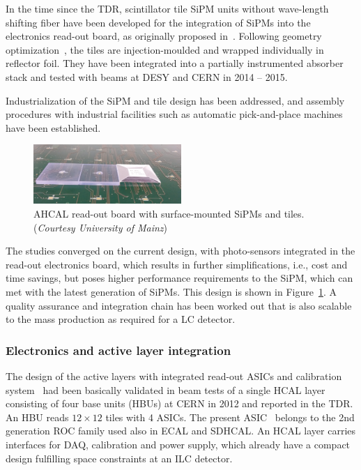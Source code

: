 In the time since the TDR, scintillator tile SiPM units without wave-length shifting fiber have been developed for the integration of SiPMs into the electronics read-out board, as originally proposed in~\cite{Blazey:2009zz}. Following geometry optimization~\cite{2010NIMPA.620..196S,Liu:2015cpe}, the tiles are injection-moulded and wrapped individually in reflector foil. They have been integrated into a partially instrumented absorber stack and tested with beams at DESY and CERN in 2014 -- 2015.

Industrialization of the SiPM and tile design has been addressed, and assembly procedures with industrial facilities such as automatic pick-and-place machines have been established. 

\begin{figure}
	\centering
	\includegraphics[width=0.5\textwidth]{Calorimeter/AHCAL/SurfaceMountedTiles}
	\caption{AHCAL read-out board with surface-mounted SiPMs and tiles. ({\it Courtesy University of Mainz})}
	\label{fig:Calorimeter:AHCAL:HBU}
\end{figure}

The studies converged on the current design, with photo-sensors integrated in the read-out electronics board, which results in further simplifications, i.e., cost and time savings, but poses higher performance requirements to the SiPM, which can met with the latest generation of SiPMs. This design is shown in Figure~\ref{fig:Calorimeter:AHCAL:HBU}. A quality assurance and integration chain has been worked out that is also scalable to the mass production as required for a LC detector.

\subsubsection{Electronics and active layer integration}

The design of the active layers with integrated read-out ASICs and calibration system~\cite{6829522} had been basically validated in beam tests of a single HCAL layer consisting of four base units (HBUs) at CERN in 2012 and reported in the TDR. An HBU reads $12 \times 12$ tiles with 4 ASICs. The present ASIC~\cite{1748-0221-6-01-C01098} belongs to the 2nd generation ROC family used also in ECAL and SDHCAL. An HCAL layer carries interfaces for DAQ, calibration and power supply, which already have a compact design fulfilling space constraints at an ILC detector.

